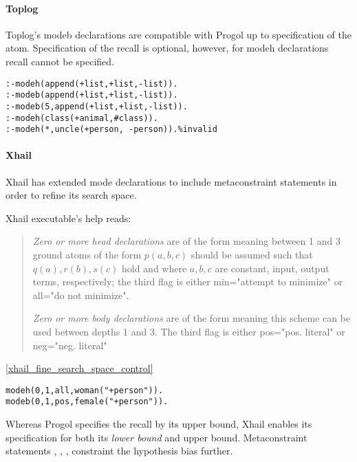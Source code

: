 \paragraph{Toplog}
Toplog's modeb declarations are compatible with Progol up to specification of the atom. Specification of the recall is optional, however, for modeh declarations recall cannot be specified\cite{santos2008toplogWebsite}.
\begin{exmp}\cite{santos2008toplogWebsite}
\begin{lstlisting}
:-modeh(append(+list,+list,-list)).
:-modeb(append(+list,+list,-list)).
:-modeb(5,append(+list,+list,-list)).
:-modeh(class(+animal,#class)).
:-modeh(*,uncle(+person, -person)).%invalid
\end{lstlisting}
\end{exmp}

\paragraph{Xhail}\label{xhail_mode_declarations}
Xhail has extended mode declarations to include metaconstraint statements in order to refine its search space.

Xhail executable's help\cite{ray2007xhail} reads:
\begin{quote}
\emph{Zero or more head declarations} are of the form
 meaning between 1 and 3 ground atoms
 of the form $p(a,b,c)$ should be assumed such that $q(a), r(b), s(c)$ hold 
 and where $a, b, c$ are constant, input, output terms, respectively;
 the third flag is either min="attempt to minimize" or all="do not minimize".
 
\emph{Zero or more body declarations} are of the form  meaning this scheme can be used between 
 depths 1 and 3.  The third flag is either pos="pos. literal" or neg="neg. literal" 
\end{quote}

\begin{exmp}\ref{xhail_fine_search_space_control}
\begin{lstlisting}
modeh(0,1,all,woman("+person")).
modeb(0,1,pos,female("+person")).
\end{lstlisting}
\end{exmp}

Whereas Progol specifies the recall by its upper bound, Xhail enables its specification for both its \emph{lower bound} and upper bound. Metaconstraint statements
, , ,  constraint the hypothesis bias further.

